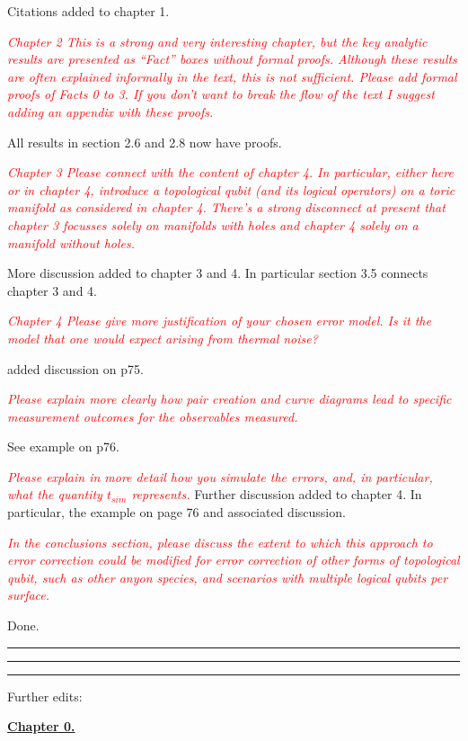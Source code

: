 \documentclass[11pt,oneside]{article}
\newcommand{\danbrowne}[1]{\vspace{10pt}\noindent\textcolor{red}{{\it #1}}}
\begin{document}
Citations added to chapter 1.

\danbrowne{
Chapter 2
This is a strong and very interesting chapter, but the key analytic results are presented as “Fact” boxes without formal proofs.
Although these results are often explained informally in the text, this is not sufficient. Please add formal proofs of Facts 0 to 3. If
you don’t want to break the flow of the text I suggest adding an appendix with these proofs.
}

All results in section 2.6 and 2.8 now have proofs.

\danbrowne{
Chapter 3
Please connect with the content of chapter 4. In particular, either here or in chapter 4, introduce a topological qubit (and its logical
operators) on a toric manifold as considered in chapter 4. There’s a strong disconnect at present that chapter 3 focusses solely on
manifolds with holes and chapter 4 solely on a manifold without holes.
}

More discussion added to chapter 3 and 4.
In particular section 3.5 connects chapter 3 and 4.

\danbrowne{
Chapter 4
Please give more justification of your chosen error model.
Is it the model that one would expect arising from thermal noise?}

added discussion on p75.

\danbrowne{Please explain more clearly how pair creation and curve
diagrams lead to specific measurement outcomes for the observables
measured.}

See example on p76.

\danbrowne{
Please explain in more detail how you simulate the errors,
and, in particular, what the quantity $t_{sim}$ represents.
}
Further discussion added to chapter 4.
In particular, the example on page 76 and associated discussion.

\danbrowne{
In the conclusions section, please discuss the extent
to which this approach to error correction could be modified for error
correction of other forms of topological qubit, such
as other anyon species, and scenarios with multiple logical qubits per surface.
}

Done.

\vspace{20pt}
\hrule
\hrule
\hrule
\vspace{20pt}

Further edits:

{\vspace{20pt}\noindent \bf \underline{Chapter 0.}}
\end{document}
